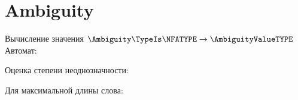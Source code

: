 \section{Ambiguity}
\begin{frame}[fragile]{Вычисление значения $\Ambiguity\TypeIs\NFATYPE\to\AmbiguityValueTYPE$}
	Автомат:


	Оценка степени неоднозначности:

	Для максимальной длины слова:


\end{frame}

